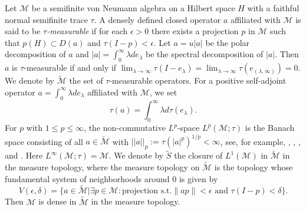 \documentclass[a4paper,12pt]{amsart}
\newcommand{\M}{\mathcal{M}}
\begin{document}
Let $\M$ be a semifinite von Neumann algebra on a Hilbert space $H$ with a faithful normal semifinite trace $\tau$.  A densely defined closed operator 
$a$ affiliated with $\M$ is said to be {\it $\tau$-measurable} if for each $\epsilon > 0$ there exists a projection $p$ in $\M$ such that  $p(H) \subset D(a)$ and $\tau(I-p) < \epsilon$. Let $a = u|a|$ be the polar decomposition of $a$ and 
$|a| = \int_0^{\infty} \lambda d e_{\lambda}$ be the spectral decomposition of $|a|$. Then $a$ is $\tau$-measurable if and only if 
$\lim _{\lambda  \to \infty} \tau(I- e_{\lambda}) = \lim _{\lambda  \to \infty} \tau(e_{({\lambda}, \infty)} )= 0$.  We denote by  $\tilde{\M}$ 
the set of  $\tau$-measurable operators. For a positive self-adjoint operator $a = \int_0^{\infty} \lambda d e_{\lambda}$ 
affiliated with $\M$, we set 
$$
\tau(a) =  \int_0^{\infty} \lambda d\tau( e_{\lambda}). 
$$
 For $p$ with $1 \leq p \leq \infty$, the non-commutative $L^p$-space $L^p(\M;\tau)$   
is the Banach space consisting of all $a \in \tilde{\M}$ with $||a||_p := \tau(|a|^p)^{1/p} < \infty$, see, for example, \cite{nelson}, \cite{segal}, \cite{terp}, and \cite{F-K}. 
Here  $L^{\infty}(\M;\tau) = \M$. 
We denote by $\tilde{S}$ the closure of $L^1(\M)$ in  $\tilde{\M}$ in the measure topology, where the measure topology on  $\tilde{\M}$ is the topology whose fundamental 
system of neighborhoods around $0$ is given by 
$$
V(\epsilon, \delta) = \{a \in \tilde{\M} | \exists p \in \M : \text{projection s.t.}  
\|ap\| <\epsilon \text{ and }  \tau(I-p) < \delta\}. 
$$
Then $\M$ is dense in  $\tilde{\M}$ in the measure topology.  
\end{document}
